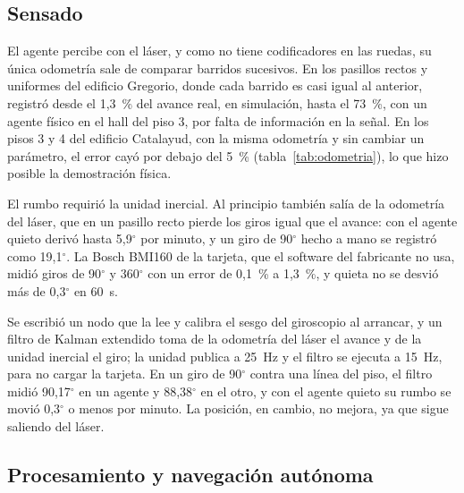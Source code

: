 \subsection{Sensado}
\label{sec:odometria-laser}
\label{sec:imu}

El agente percibe con el láser, y como no tiene codificadores en las ruedas, su única odometría sale de comparar barridos sucesivos. En los pasillos rectos y uniformes del edificio Gregorio, donde cada barrido es casi igual al anterior, registró desde el 1,3~\% del avance real, en simulación, hasta el 73~\%, con un agente físico en el hall del piso 3, por falta de información en la señal. En los pisos 3 y 4 del edificio Catalayud, con la misma odometría y sin cambiar un parámetro, el error cayó por debajo del 5~\% (tabla~\ref{tab:odometria}), lo que hizo posible la demostración física.

El rumbo requirió la unidad inercial. Al principio también salía de la odometría del láser, que en un pasillo recto pierde los giros igual que el avance: con el agente quieto derivó hasta 5,9$^\circ$ por minuto, y un giro de 90$^\circ$ hecho a mano se registró como 19,1$^\circ$. La Bosch BMI160 de la tarjeta, que el software del fabricante no usa, midió giros de 90$^\circ$ y 360$^\circ$ con un error de 0,1~\% a 1,3~\%, y quieta no se desvió más de 0,3$^\circ$ en 60~s.

Se escribió un nodo que la lee y calibra el sesgo del giroscopio al arrancar, y un filtro de Kalman extendido toma de la odometría del láser el avance y de la unidad inercial el giro; la unidad publica a 25~Hz y el filtro se ejecuta a 15~Hz, para no cargar la tarjeta. En un giro de 90$^\circ$ contra una línea del piso, el filtro midió 90,17$^\circ$ en un agente y 88,38$^\circ$ en el otro, y con el agente quieto su rumbo se movió 0,3$^\circ$ o menos por minuto. La posición, en cambio, no mejora, ya que sigue saliendo del láser.

\subsection{Procesamiento y navegación autónoma}
\label{sec:primeros-entornos}
\label{sec:nav2-ackermann}

